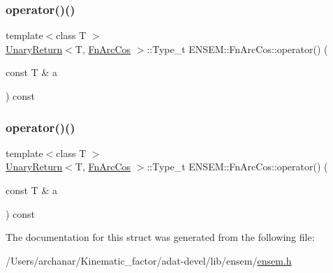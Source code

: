 \mbox{\label{structENSEM_1_1FnArcCos_a7d507fc5962b17eedfa81873113d0b96}} 
\subsubsection{\texorpdfstring{operator()()}{operator()()}\hspace{0.1cm}{\footnotesize\ttfamily [2/3]}}
{\footnotesize\ttfamily template$<$class T $>$ \\
\mbox{\hyperlink{structENSEM_1_1UnaryReturn}{Unary\+Return}}$<$T, \mbox{\hyperlink{structENSEM_1_1FnArcCos}{Fn\+Arc\+Cos}} $>$\+::Type\+\_\+t E\+N\+S\+E\+M\+::\+Fn\+Arc\+Cos\+::operator() (\begin{DoxyParamCaption}\item[{const T \&}]{a }\end{DoxyParamCaption}) const\hspace{0.3cm}{\ttfamily [inline]}}

\mbox{\label{structENSEM_1_1FnArcCos_a7d507fc5962b17eedfa81873113d0b96}} 
\subsubsection{\texorpdfstring{operator()()}{operator()()}\hspace{0.1cm}{\footnotesize\ttfamily [3/3]}}
{\footnotesize\ttfamily template$<$class T $>$ \\
\mbox{\hyperlink{structENSEM_1_1UnaryReturn}{Unary\+Return}}$<$T, \mbox{\hyperlink{structENSEM_1_1FnArcCos}{Fn\+Arc\+Cos}} $>$\+::Type\+\_\+t E\+N\+S\+E\+M\+::\+Fn\+Arc\+Cos\+::operator() (\begin{DoxyParamCaption}\item[{const T \&}]{a }\end{DoxyParamCaption}) const\hspace{0.3cm}{\ttfamily [inline]}}



The documentation for this struct was generated from the following file\+:\begin{DoxyCompactItemize}
\item 
/\+Users/archanar/\+Kinematic\+\_\+factor/adat-\/devel/lib/ensem/\mbox{\hyperlink{adat-devel_2lib_2ensem_2ensem_8h}{ensem.\+h}}\end{DoxyCompactItemize}
